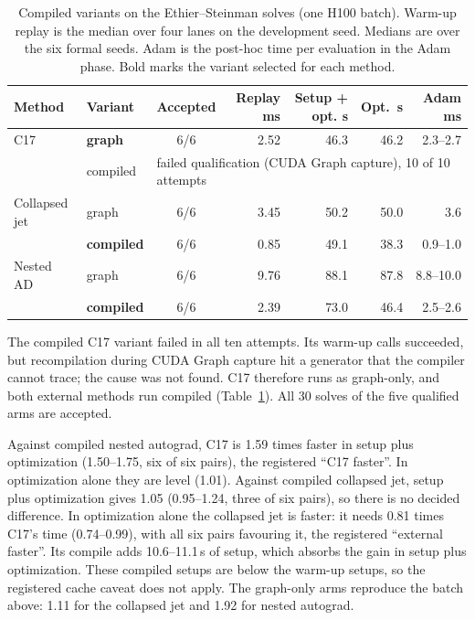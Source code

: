 \documentclass[11pt]{article}
\begin{document}
\begin{table}[htbp]\centering\small
\setlength{\tabcolsep}{4pt}
\caption{Compiled variants on the Ethier--Steinman solves (one H100 batch). Warm-up replay is the median over four lanes on the development seed. Medians are over the six formal seeds. Adam is the post-hoc time per evaluation in the Adam phase. Bold marks the variant selected for each method.}
\label{tab:ethierext2}
\begin{tabular}{llcrrrr}\toprule
Method & Variant & Accepted & Replay ms & Setup + opt. s & Opt.\ s & Adam ms\\\midrule
C17 & \textbf{graph} & 6/6 & 2.52 & 46.3 & 46.2 & 2.3--2.7\\
 & compiled & \multicolumn{5}{l}{failed qualification (CUDA Graph capture), 10 of 10 attempts}\\
Collapsed jet & graph & 6/6 & 3.45 & 50.2 & 50.0 & 3.6\\
 & \textbf{compiled} & 6/6 & 0.85 & 49.1 & 38.3 & 0.9--1.0\\
Nested AD & graph & 6/6 & 9.76 & 88.1 & 87.8 & 8.8--10.0\\
 & \textbf{compiled} & 6/6 & 2.39 & 73.0 & 46.4 & 2.5--2.6\\
\bottomrule\end{tabular}
\end{table}

The compiled C17 variant failed in all ten attempts. Its warm-up calls
succeeded, but recompilation during CUDA Graph capture hit a generator that
the compiler cannot trace; the cause was not found. C17 therefore runs as
graph-only, and both external methods run compiled
(Table~\ref{tab:ethierext2}). All 30 solves of the five qualified arms are
accepted.

Against compiled nested autograd, C17 is 1.59 times faster in setup plus
optimization (1.50--1.75, six of six pairs), the registered ``C17 faster''.
In optimization alone they are level (1.01). Against compiled collapsed jet,
setup plus optimization gives 1.05 (0.95--1.24, three of six pairs), so
there is no decided difference. In optimization alone the collapsed jet is
faster: it needs 0.81 times C17's time (0.74--0.99), with all six pairs
favouring it, the registered ``external faster''. Its compile adds
10.6--11.1\,s of setup, which absorbs the gain in setup plus optimization.
These compiled setups are below the warm-up setups, so the registered
cache caveat does not apply. The graph-only arms reproduce the batch above:
1.11 for the collapsed jet and 1.92 for nested autograd.
\end{document}
